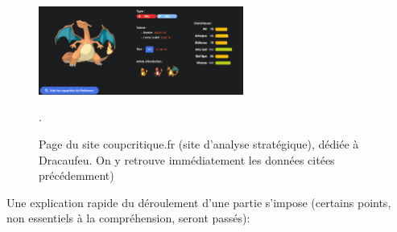 \documentclass[a4paper,12pt]{article}
\begin{document}
\begin{figure}[!h]
    \centering
    \includegraphics[width=0.6\textwidth]{Image/dracaufeu_coup_critique.png}
    \caption{Page du site coupcritique.fr (site d'analyse stratégique), dédiée à
    Dracaufeu. On y retrouve immédiatement les données citées précédemment)}.
    \label{fig:image2}
\end{figure}

Une explication rapide du déroulement d'une partie s'impose (certains points,
non essentiels à la compréhension, seront passés):
\end{document}

